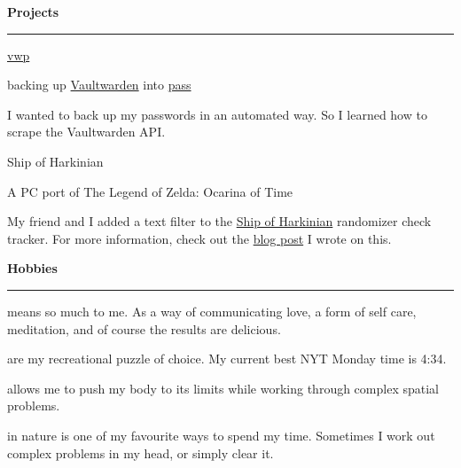\documentclass[letterpaper]{article}
\newcommand{\primary}{\color{primary}}
\newcommand{\primarydark}{\color{primarydark}}
\newcommand{\complementary}{\color{complementary}}
\newcommand{\vwp}{\href{https://michael.stergianis.ca/projects/vwp}{vwp}}
\newenvironment{heading}[1]{%
  {\LARGE \primarydark \textbf{#1}}\\ {\complementary
    \rule[5pt]{\linewidth}{0.6pt}}
}
{\par\vspace{8pt}}
\newcommand{\blockend}{\vspace{4pt}}
\newenvironment{project}[2]{%
  { #1 \par }
  { \small \primary #2 \par }%
}{
  \blockend{}
}
\newenvironment{prose}{\small}{\par}
\newcommand{\hobby}[2]{%
  {\small {\primarydark{#1}} #2} \par \vspace{2pt}
}
\begin{document}
\begin{minipage}[t]{0.39\textwidth}
\begin{heading}{Projects}
    \begin{project}{\vwp{}}
      {backing up \href{https://www.vaultwarden.ca/}{Vaultwarden} into
        \href{https://www.passwordstore.org/}{pass}}
      \begin{prose}
        I wanted to back up my passwords in an automated way. So I learned how
        to scrape the Vaultwarden API.
      \end{prose}
    \end{project}

    \begin{project}{Ship of Harkinian}
      {A PC port of The Legend of Zelda: Ocarina of Time}%
      \begin{prose}
        My friend and I added a text filter to the
        \href{https://www.shipofharkinian.com/}{Ship of Harkinian} randomizer
        check tracker. For more information, check out the
        \href{https://michael.stergianis.ca/posts/adding-a-text-filter-to-the-ship-of-harkinian-randomizer-check-tracker/}{blog
          post} I wrote on this.
      \end{prose}
    \end{project}
  \end{heading}
  \begin{heading}{Hobbies}
    \hobby{Cooking}{means so much to me. As a way of communicating love, a form
      of self care, meditation, and of course the results are delicious.}

    \hobby{Crosswords}{are my recreational puzzle of choice. My current best NYT
      Monday time is 4:34.}

    \hobby{Bouldering}{allows me to push my body to its limits while working
      through complex spatial problems.}

    \hobby{Hiking}{in nature is one of my favourite ways to spend my time.
      Sometimes I work out complex problems in my head, or simply clear it.}
  \end{heading}
\end{minipage}
\end{document}
